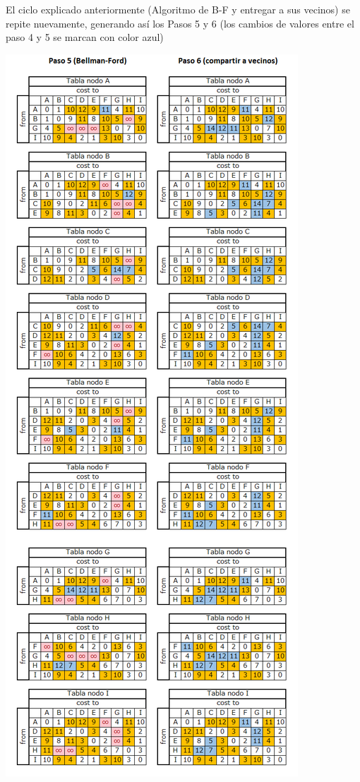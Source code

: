 \documentclass{article}
\begin{document}
El ciclo explicado anteriormente (Algoritmo de B-F y entregar a sus vecinos) se repite nuevamente, generando así los Pasos 5 y 6 (los cambios de valores entre el paso 4 y 5 se marcan con color azul)\\
\centerline{\includegraphics[scale=0.5]{Img/paso56.png}}\\
\end{document}
